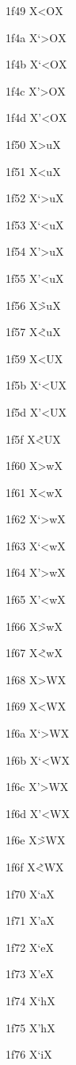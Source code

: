 \documentclass[11pt]{article}
\begin{document}
1f49 X{\textgreek{<O}}X

1f4a X{\textgreek{`>O}}X

1f4b X{\textgreek{`<O}}X

1f4c X{\textgreek{'>O}}X

1f4d X{\textgreek{'<O}}X

1f50 X{\textgreek{>u}}X

1f51 X{\textgreek{<u}}X

1f52 X{\textgreek{`>u}}X

1f53 X{\textgreek{`<u}}X

1f54 X{\textgreek{'>u}}X

1f55 X{\textgreek{'<u}}X

1f56 X{\textgreek{\~{>u}}}X

1f57 X{\textgreek{\~{<u}}}X

1f59 X{\textgreek{<U}}X

1f5b X{\textgreek{`<U}}X

1f5d X{\textgreek{'<U}}X

1f5f X{\textgreek{\~{<U}}}X

1f60 X{\textgreek{>w}}X

1f61 X{\textgreek{<w}}X

1f62 X{\textgreek{`>w}}X

1f63 X{\textgreek{`<w}}X

1f64 X{\textgreek{'>w}}X

1f65 X{\textgreek{'<w}}X

1f66 X{\textgreek{\~{>w}}}X

1f67 X{\textgreek{\~{<w}}}X

1f68 X{\textgreek{>W}}X

1f69 X{\textgreek{<W}}X

1f6a X{\textgreek{`>W}}X

1f6b X{\textgreek{`<W}}X

1f6c X{\textgreek{'>W}}X

1f6d X{\textgreek{'<W}}X

1f6e X{\textgreek{\~{>W}}}X

1f6f X{\textgreek{\~{<W}}}X

1f70 X{\textgreek{`a}}X

1f71 X{\textgreek{'a}}X

1f72 X{\textgreek{`e}}X

1f73 X{\textgreek{'e}}X

1f74 X{\textgreek{`h}}X

1f75 X{\textgreek{'h}}X

1f76 X{\textgreek{`i}}X
\end{document}
